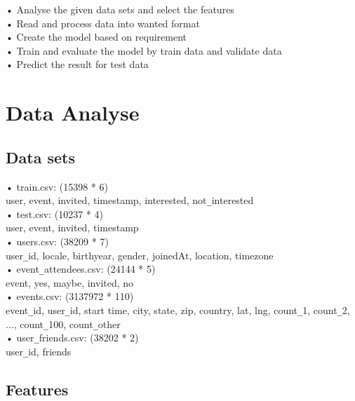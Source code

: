 \documentclass{article}
\begin{document}
•	Analyse the given data sets and select the features\\
•	Read and process data into wanted format\\
•	Create the model based on requirement\\
•	Train and evaluate the model by train data and validate data\\
•	Predict the result for test data

\section{Data Analyse}

\subsection{Data sets}

•	train.csv: (15398 * 6)\\
	user, event, invited, timestamp, interested, not\verb+_+interested\\
•	test.csv: (10237 * 4)\\
	user, event, invited, timestamp\\
•	users.csv: (38209 * 7)\\
	user\verb+_+id, locale, birthyear, gender, joinedAt, location, timezone\\
•	event\verb+_+attendees.csv: (24144 * 5)\\
	event, yes, maybe, invited, no\\
•	events.csv: (3137972 * 110)\\
	event\verb+_+id, user\verb+_+id, start time, city, state, zip, country, lat, lng, count\verb+_+1, count\verb+_+2, ..., count\verb+_+100, count\verb+_+other\\
•	user\verb+_+friends.csv: (38202 * 2)\\
	user\verb+_+id, friends
	
\subsection{Features}
\end{document}
